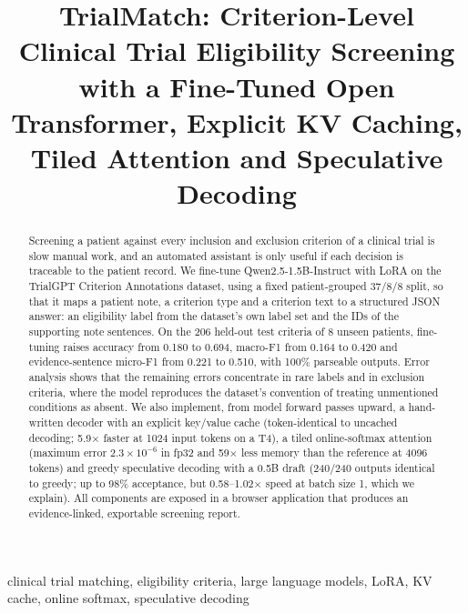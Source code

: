 \documentclass[conference]{IEEEtran}
\begin{document}
\title{TrialMatch: Criterion-Level Clinical Trial Eligibility Screening with a Fine-Tuned Open Transformer, Explicit KV Caching, Tiled Attention and Speculative Decoding}

\author{
}

\maketitle

\begin{abstract}
Screening a patient against every inclusion and exclusion criterion of a clinical trial is slow manual work, and an automated assistant is only useful if each decision is traceable to the patient record. We fine-tune Qwen2.5-1.5B-Instruct with LoRA on the TrialGPT Criterion Annotations dataset, using a fixed patient-grouped 37/8/8 split, so that it maps a patient note, a criterion type and a criterion text to a structured JSON answer: an eligibility label from the dataset's own label set and the IDs of the supporting note sentences. On the 206 held-out test criteria of 8 unseen patients, fine-tuning raises accuracy from 0.180 to 0.694, macro-F1 from 0.164 to 0.420 and evidence-sentence micro-F1 from 0.221 to 0.510, with 100\% parseable outputs. Error analysis shows that the remaining errors concentrate in rare labels and in exclusion criteria, where the model reproduces the dataset's convention of treating unmentioned conditions as absent. We also implement, from model forward passes upward, a hand-written decoder with an explicit key/value cache (token-identical to uncached decoding; 5.9$\times$ faster at 1024 input tokens on a T4), a tiled online-softmax attention (maximum error $2.3\times10^{-6}$ in fp32 and 59$\times$ less memory than the reference at 4096 tokens) and greedy speculative decoding with a 0.5B draft (240/240 outputs identical to greedy; up to 98\% acceptance, but 0.58--1.02$\times$ speed at batch size 1, which we explain). All components are exposed in a browser application that produces an evidence-linked, exportable screening report.
\end{abstract}

\begin{IEEEkeywords}
clinical trial matching, eligibility criteria, large language models, LoRA, KV cache, online softmax, speculative decoding
\end{IEEEkeywords}
\end{document}
